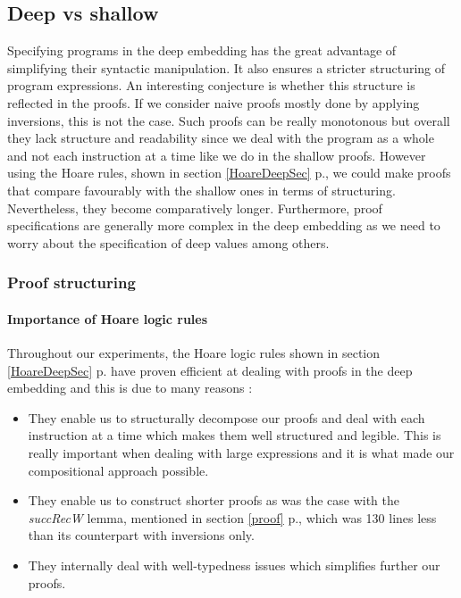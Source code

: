 \subsection{Deep vs shallow}
Specifying programs in the deep embedding has the great advantage of simplifying their syntactic manipulation. It also ensures a stricter structuring of program expressions. An interesting conjecture is whether this structure is reflected in the proofs. If we consider naive proofs mostly done by applying inversions, this is not the case. Such proofs can be really monotonous but overall they lack structure and readability since we deal with the program as a whole and not each instruction at a time like we do in the shallow proofs. However using the Hoare rules, shown in section \ref{HoareDeepSec} p.\pageref{HoareDeepSec}, we could make proofs that compare favourably with the shallow ones in terms of structuring. Nevertheless, they become comparatively longer. Furthermore, proof specifications are generally more complex in the deep embedding as we need to worry about the specification of deep values among others. 

\subsubsection{Proof structuring}
\paragraph{Importance of Hoare logic rules} \label{HoareRules}
Throughout our experiments, the Hoare logic rules shown in section \ref{HoareDeepSec} p.\pageref{HoareDeepSec} have proven efficient at dealing with proofs in the deep embedding and this is due to many reasons :
\begin{itemize}
	\item They enable us to structurally decompose our proofs and deal with each instruction at a time which makes them well structured and legible. This is really important when dealing with large expressions and it is what made our compositional approach possible.
	\item They enable us to construct shorter proofs as was the case with the \textit{succRecW} lemma, mentioned in section \ref{proof} p.\pageref{proof}, which was 130 lines less than its counterpart with inversions only. 
	\item They internally deal with well-typedness issues which simplifies further our proofs.
\end{itemize}

